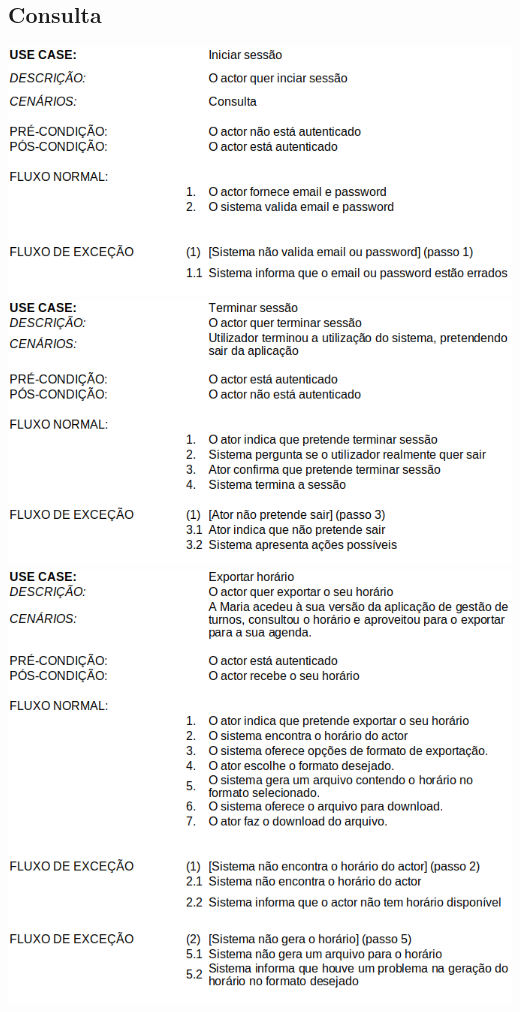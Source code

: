 \documentclass[a4paper,12pt]{article}
\begin{document}
    \subsection{Consulta}
    \includegraphics[width=\textwidth]{inicarSessao.png}\vspace{2cm}
    \includegraphics[width=\textwidth]{terminarsessao.png}\vspace{0.1cm}
    \includegraphics[width=\textwidth]{exportarHorario.png}
\end{document}
